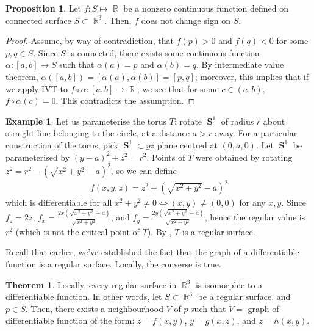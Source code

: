 \documentclass{amsart} %
\theoremstyle{mytheoremstyle}
\theoremstyle{definition}
\newtheorem{proposition}[definition]{Proposition}
\newtheorem{theorem}[definition]{Theorem}
\newtheorem{example}[definition]{Example}
\numberwithin{equation}{section}
\DeclareMathOperator{\R}{\mathbb{R}}
\DeclareMathOperator{\1}{\mathbbm{1}}
\DeclareMathOperator{\sphere}{\mathbf{S}}
\begin{document}
\begin{proposition}
	\label{propnonzerocontinuousfunctiononconnectednotchangesign}
	Let $f: S \mapsto \R$ be a nonzero continuous function defined on connected surface $S \subset \R^3$. Then, $f$ does not change sign on $S$.
\end{proposition}

\begin{proof}
	Assume, by way of contradiction, that $f(p) > 0$ and $f(q) < 0$ for some $p,q \in S$. Since $S$ is connected, there exists some continuous function $\alpha:[a,b] \mapsto S$ such that $\alpha(a) = p$ and $\alpha(b) = q$. By intermediate value theorem, $\alpha([a,b]) = [\alpha(a),\alpha(b)] = [p,q]$; moreover, this implies that if we apply IVT to $f \circ \alpha: [a,b] \to \R$, we see that for some $c \in (a,b)$, $f \circ \alpha (c) = 0$. This contradicts the assumption.
\end{proof}

\begin{example}
	\label{exampletorus}
	Let us parameterise the torus $T$: rotate $\sphere^1$ of radius $r$ about straight line belonging to the circle, at a distance $a > r$ away. For a particular construction of the torus, pick $\sphere^1 \subset yz$ plane centred at $(0,a,0)$. Let $\sphere^1$ be parameterised by $(y-a)^2 + z^2 = r^2$. Points of $T$ were obtained by rotating $z^2 = r^2 - (\sqrt{x^2 + y^2} - a)^2$, so we can define
	\begin{align*}
	f(x,y,z) = z^2 + (\sqrt{x^2 + y^2} - a)^2
	\end{align*}
	which is differentiable for all $x^2 + y^2 \neq 0 \iff (x,y) \neq (0,0)$ for any $x,y$. Since $f_z = 2z$, $f_x = \frac{2x (\sqrt{x^2+y^2} - a )}{\sqrt{x^2 + y^2}}$, and $f_y = \frac{2y (\sqrt{x^2+y^2} - a )}{\sqrt{x^2 + y^2}}$, hence the regular value is $r^2$ (which is not the critical point of $T$). By , $T$ is a regular surface.
\end{example}

Recall that earlier, we've established the fact that the graph of a differentiable function is a regular surface. Locally, the converse is true.

\begin{theorem}
	\label{thmlocalisomorphismbetweengeometryanddifferentiablefunction}
	Locally, every regular surface in $\R^3$ is isomorphic to a differentiable function. In other words, let $S \subset \R^3$ be a regular surface, and $p \in S$. Then, there exists a neighbourhood $V$ of $p$ such that $V= $ graph of differentiable function of the form: $z=f(x,y)$, $y = g(x,z)$, and $z = h(x,y)$.
\end{theorem}
\end{document}
